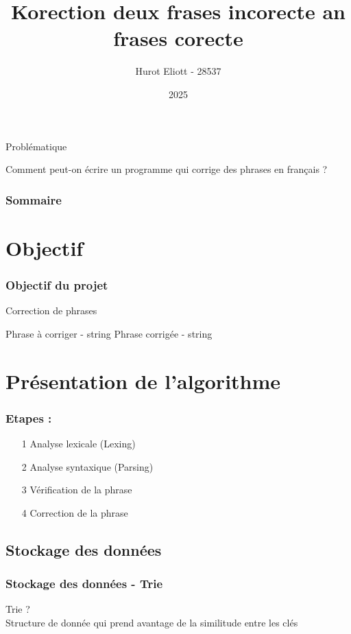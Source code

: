 \documentclass{beamer}
\title{Korection deux frases incorecte an frases corecte}
\author{Hurot Eliott - 28537}
\date{2025}
\begin{document}

\frame{\titlepage}

\begin{frame}{Problématique}
   \begin{center}
      \huge{Comment peut-on écrire un programme qui corrige des phrases en français ?}
   \end{center}
\end{frame}

\begin{frame}
   \frametitle{Sommaire}
   \tableofcontents
\end{frame}

\section{Objectif}
\begin{frame}
   \frametitle{Objectif du projet}
   \begin{algorithm}[H]
      \caption{Correction de phrases}
      \begin{algorithmic}
         \Require Phrase à corriger - string
         \Ensure Phrase corrigée - string
      \end{algorithmic}
   \end{algorithm}
\end{frame}

\section{Présentation de l'algorithme}
\begin{frame}
   \frametitle{Etapes :}
   \begin{enumerate}
      \item[\Large{1}] \Large{Analyse lexicale (Lexing)}
      \item[2] \Large{Analyse syntaxique (Parsing)}
      \item[3] \Large{Vérification de la phrase}
      \item[4] \Large{Correction de la phrase}
   \end{enumerate}
\end{frame}

\subsection{Stockage des données}
\begin{frame}
   \frametitle{Stockage des données - Trie}
   Trie ?\\
   Structure de donnée qui prend avantage de la similitude entre les clés
\end{frame}
\end{document}
